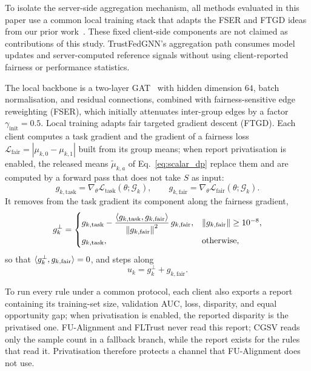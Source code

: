 To isolate the server-side aggregation mechanism, all methods evaluated in this paper use a common local training stack that adapts the FSER and FTGD ideas from our prior work~\citep{dang2026fedfairgnn}. These fixed client-side components are not claimed as contributions of this study. TrustFedGNN's aggregation path consumes model updates and server-computed reference signals without using client-reported fairness or performance statistics.

The local backbone is a two-layer GAT~\citep{velickovic2017graph} with hidden dimension $64$, batch normalisation, and residual connections, combined with fairness-sensitive edge reweighting (FSER), which initially attenuates inter-group edges by a factor $\gamma_{\mathrm{init}} = 0.5$. Local training adapts fair targeted gradient descent (FTGD). Each client computes a task gradient and the gradient of a fairness loss $\mathcal{L}_{\mathrm{fair}} = |\mu_{k,0} - \mu_{k,1}|$ built from its group means; when report privatisation is enabled, the released means $\tilde{\mu}_{k,a}$ of Eq.~\eqref{eq:scalar_dp} replace them and are computed by a forward pass that does not take $S$ as input:
\begin{equation}
\label{eq:local_grads}
g_{k,\mathrm{task}} = \nabla_\theta \mathcal{L}_{\mathrm{task}}(\theta; \mathcal{G}_k), \qquad g_{k,\mathrm{fair}} = \nabla_\theta \mathcal{L}_{\mathrm{fair}}(\theta; \mathcal{G}_k).
\end{equation}
It removes from the task gradient its component along the fairness gradient,
\begin{equation}
\label{eq:ftgd_proj}
g_k^{\perp} = \begin{cases}
g_{k,\mathrm{task}} - \dfrac{\langle g_{k,\mathrm{task}}, g_{k,\mathrm{fair}} \rangle}{\left\lVert g_{k,\mathrm{fair}} \right\rVert^2}\, g_{k,\mathrm{fair}}, & \left\lVert g_{k,\mathrm{fair}} \right\rVert \ge 10^{-8}, \\
g_{k,\mathrm{task}}, & \text{otherwise},
\end{cases}
\end{equation}
so that $\langle g_k^{\perp}, g_{k,\mathrm{fair}} \rangle = 0$, and steps along
\begin{equation}
\label{eq:ftgd_update_step}
u_k = g_k^{\perp} + g_{k,\mathrm{fair}}.
\end{equation}

To run every rule under a common protocol, each client also exports a report containing its training-set size, validation AUC, loss, disparity, and equal opportunity gap; when privatisation is enabled, the reported disparity is the privatised one. FU-Alignment and FLTrust never read this report; CGSV reads only the sample count in a fallback branch, while the report exists for the rules that read it. Privatisation therefore protects a channel that FU-Alignment does not use.

